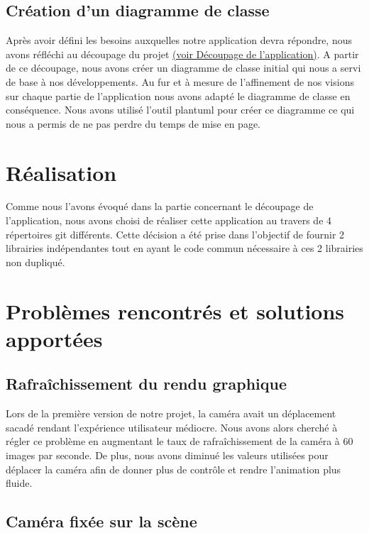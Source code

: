 \documentclass[11pt]{report}
\begin{document}
\subsection{Création d'un diagramme de classe}

Après avoir défini les besoins auxquelles notre application devra répondre, nous avons réfléchi au découpage du projet \hyperlink{découpage}{(voir Découpage de l'application)}.
A partir de ce découpage, nous avons créer un diagramme de classe initial qui nous a servi de base à nos développements. 
Au fur et à mesure de l'affinement de nos visions sur chaque partie de l'application nous avons adapté le diagramme de classe en conséquence.
Nous avons utilisé l'outil plantuml pour créer ce diagramme ce qui nous a permis de ne pas perdre du temps de mise en page. 

\section{Réalisation}

Comme nous l'avons évoqué dans la partie concernant le découpage de l'application, nous avons choisi de réaliser cette application au travers de 4 répertoires git différents. Cette décision a été prise dans l'objectif de fournir 2 librairies indépendantes tout en ayant le code commun nécessaire à ces 2 librairies non dupliqué.\newline


\section{Problèmes rencontrés et solutions apportées}

\subsection{Rafraîchissement du rendu graphique}

Lors de la première version de notre projet, la caméra avait un déplacement sacadé rendant l'expérience utilisateur médiocre. Nous avons alors
cherché à régler ce problème en augmentant le taux de rafraîchissement de la caméra à 60 images par seconde. De plus, nous avons diminué
les valeurs utilisées pour déplacer la caméra afin de donner plus de contrôle et rendre l'animation plus fluide.

\subsection{Caméra fixée sur la scène}
\end{document}
